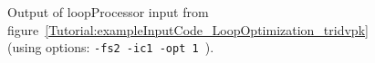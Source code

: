 \begin{figure}[!h]
{\indent
{\mySmallFontSize


\begin{latexonly}
   
\end{latexonly}

\begin{htmlonly}
   
\end{htmlonly}

}
}
\caption{Output of loopProcessor input from figure~\ref{Tutorial:exampleInputCode_LoopOptimization_tridvpk}
    (using options: {\tt -fs2 -ic1 -opt 1 }).}
\label{Tutorial:exampleOutput_LoopOptimization_tridvpk}
\end{figure}

